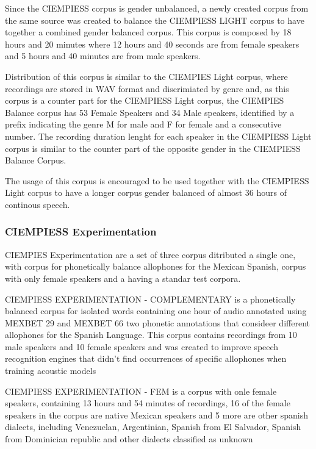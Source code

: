 \documentclass[10pt, a4paper]{article}
\begin{document}
Since the CIEMPIESS corpus is gender unbalanced, a newly created corpus from the same source was created to balance the CIEMPIESS LIGHT corpus to have together a combined gender balanced corpus. This corpus is composed by 18 hours and 20 minutes where 12 hours and 40 seconds are from female speakers and 5 hours and 40 minutes are from male speakers.

Distribution of this corpus is similar to the CIEMPIES Light corpus, where recordings are stored in WAV format and discrimiated by genre and, as this corpus is a counter part for the CIEMPIESS Light corpus, the CIEMPIES Balance corpus has 53 Female Speakers and 34 Male speakers, identified by a prefix indicating the genre M for male and F for female and a consecutive number. The recording duration lenght for each speaker in the CIEMPIESS Light corpus is similar to the counter part of the opposite gender in the CIEMPIESS Balance Corpus.

The usage of this corpus is encouraged to be used together with the CIEMPIESS Light corpus to have a longer corpus gender balanced of almost 36 hours of continous speech.

\subsubsection{CIEMPIESS Experimentation}

CIEMPIES Experimentation are a set of three corpus ditributed a single one, with corpus for phonetically balance allophones for the Mexican Spanish, corpus with only female speakers and a having a standar test corpora.

CIEMPIESS EXPERIMENTATION - COMPLEMENTARY is a phonetically balanced corpus for isolated words containing one hour of audio annotated using MEXBET 29 and MEXBET 66 two phonetic annotations that consideer different allophones for the Spanish Language. This corpus contains recordings from 10 male speakers and 10 female speakers and was created to improve speech recognition engines that didn't find occurrences of specific allophones when training acoustic models

CIEMPIESS EXPERIMENTATION - FEM is a corpus with onle female speakers, containing 13 hours and 54 minutes of recordings, 16 of the female speakers in the corpus are native Mexican speakers and 5 more are other spanish dialects, including Venezuelan, Argentinian, Spanish from El Salvador, Spanish from Dominician republic and other dialects classified as unknown
\end{document}

